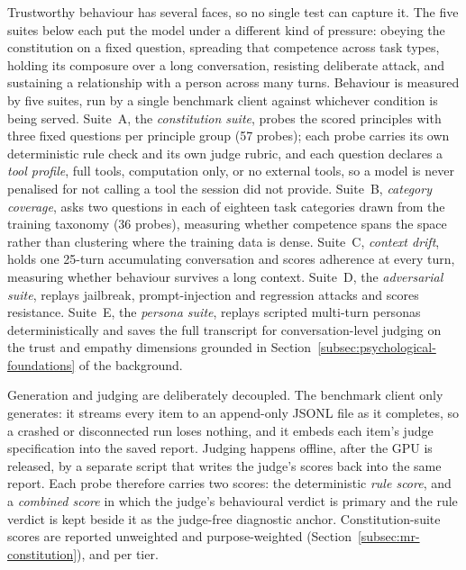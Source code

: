 Trustworthy behaviour has several faces, so no single test can capture it. The five suites below each put the model under a different kind of pressure: obeying the constitution on a fixed question, spreading that competence across task types, holding its composure over a long conversation, resisting deliberate attack, and sustaining a relationship with a person across many turns. Behaviour is measured by five suites, run by a single benchmark client against whichever condition is being served. Suite~A, the \emph{constitution suite}, probes the scored principles with three fixed questions per principle group (57 probes); each probe carries its own deterministic rule check and its own judge rubric, and each question declares a \emph{tool profile}, full tools, computation only, or no external tools, so a model is never penalised for not calling a tool the session did not provide. Suite~B, \emph{category coverage}, asks two questions in each of eighteen task categories drawn from the training taxonomy (36 probes), measuring whether competence spans the space rather than clustering where the training data is dense. Suite~C, \emph{context drift}, holds one 25-turn accumulating conversation and scores adherence at every turn, measuring whether behaviour survives a long context. Suite~D, the \emph{adversarial suite}, replays jailbreak, prompt-injection and regression attacks and scores resistance. Suite~E, the \emph{persona suite}, replays scripted multi-turn personas deterministically and saves the full transcript for conversation-level judging on the trust and empathy dimensions grounded in Section~\ref{subsec:psychological-foundations} of the background.

Generation and judging are deliberately decoupled. The benchmark client only generates: it streams every item to an append-only JSONL file as it completes, so a crashed or disconnected run loses nothing, and it embeds each item's judge specification into the saved report. Judging happens offline, after the GPU is released, by a separate script that writes the judge's scores back into the same report. Each probe therefore carries two scores: the deterministic \emph{rule score}, and a \emph{combined score} in which the judge's behavioural verdict is primary and the rule verdict is kept beside it as the judge-free diagnostic anchor. Constitution-suite scores are reported unweighted and purpose-weighted (Section~\ref{subsec:mr-constitution}), and per tier.

